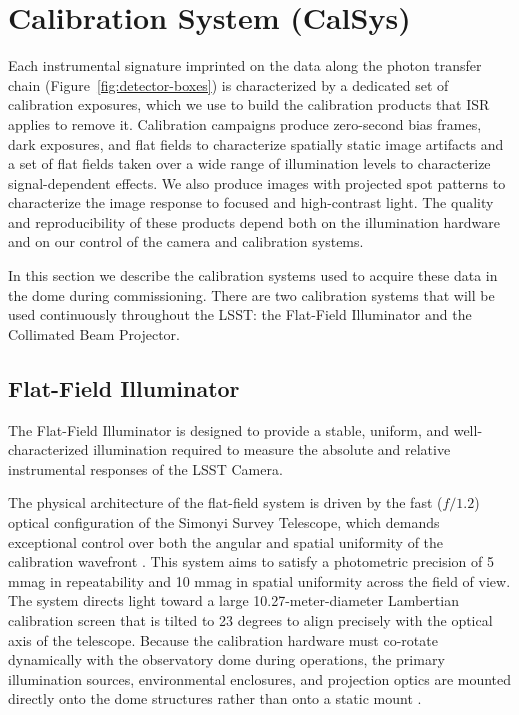 \section{Calibration System (CalSys)}\label{sec:calsys}
Each instrumental signature imprinted on the data along the photon transfer chain (Figure~\ref{fig:detector-boxes}) is characterized by a dedicated set of calibration exposures, which we use to build the calibration products that ISR applies to remove it.
Calibration campaigns produce zero-second bias frames, dark exposures, and flat fields to characterize spatially static image artifacts and a set of flat fields taken over a wide range of illumination levels to characterize signal-dependent effects.
We also produce images with projected spot patterns to characterize the image response to focused and high-contrast light.
The quality and reproducibility of these products depend both on the illumination hardware and on our control of the camera and calibration systems.

In this section we describe the calibration systems used to acquire these data in the dome during commissioning.
There are two calibration systems that will be used continuously throughout the LSST: the Flat-Field Illuminator and the Collimated Beam Projector.

\subsection{Flat-Field Illuminator}\label{sec:calsys:flat-field-illuminator}

The Flat-Field Illuminator is designed to provide a stable, uniform, and well-characterized
illumination required to measure the absolute and relative instrumental responses of the LSST Camera.

The physical architecture of the flat-field system is driven by the fast ($f/1.2$) optical configuration
of the Simonyi Survey Telescope, which demands exceptional control over both the angular and spatial
uniformity of the calibration wavefront \citep{TSTN-060}. This system aims to satisfy a photometric
precision of 5 mmag in repeatability and 10 mmag in spatial
uniformity across the field of view. The system directs light toward a
large 10.27-meter-diameter Lambertian calibration screen that is tilted to 23
degrees to align precisely with the optical axis of the telescope. Because the calibration hardware must
co-rotate dynamically with the observatory dome during operations, the primary illumination
sources, environmental enclosures, and projection optics are mounted directly onto the dome structures
rather than onto a static mount \citep{TSTN-057}.

